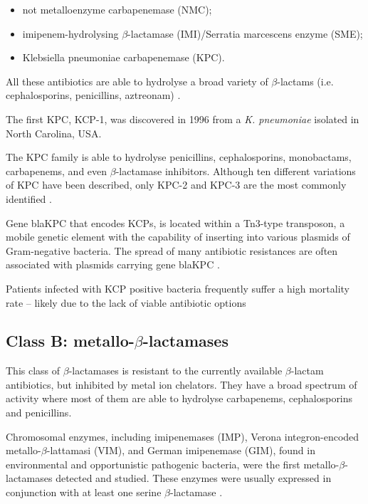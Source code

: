 \documentclass[11pt]{report}
\begin{document}
\begin{itemize}
\item not metalloenzyme carbapenemase (NMC);
\item imipenem-hydrolysing $\beta$-lactamase (IMI)/Serratia marcescens enzyme (SME); 
\item Klebsiella pneumoniae carbapenemase (KPC).
\end{itemize}

All these antibiotics are able to hydrolyse a broad variety of $\beta$-lactams (i.e. cephalosporins, penicillins, aztreonam) \cite{kong2010beta} \cite{Queenan2007}.

The first KPC, KCP-1, was discovered in 1996 from a \emph{K. pneumoniae} isolated in North Carolina, USA.

The KPC family is able to hydrolyse penicillins, cephalosporins, monobactams, carbapenems, and even $\beta$-lactamase inhibitors.
Although ten different variations of KPC have been described, only KPC-2 and KPC-3 are the most commonly identified \cite{WaltherRasmussen2007} \cite{MunozPrice2013}.

Gene blaKPC that encodes KCPs, is located within a Tn3-type transposon, a mobile genetic element with the capability of inserting into various plasmids of Gram-negative bacteria.
The spread of many antibiotic resistances are often associated with plasmids carrying gene blaKPC \cite{Queenan2007}.

Patients infected with KCP positive bacteria frequently suffer a high mortality rate – likely due to the lack of viable antibiotic options \cite{MunozPrice2013}

\subsection {Class B: metallo-$\beta$-lactamases}
This class of $\beta$-lactamases is resistant to the currently available $\beta$-lactam antibiotics, but inhibited by metal ion chelators.
They have a broad spectrum of activity where most of them are able to hydrolyse carbapenems, cephalosporins and penicillins.

Chromosomal enzymes, including imipenemases (IMP), Verona integron-encoded metallo-$\beta$-lattamasi (VIM), and German imipenemase (GIM), found in environmental and opportunistic pathogenic bacteria, were the first metallo-$\beta$-lactamases detected and studied.
These enzymes were usually expressed in conjunction with at least one serine $\beta$-lactamase \cite{Queenan2007}.
\end{document}
